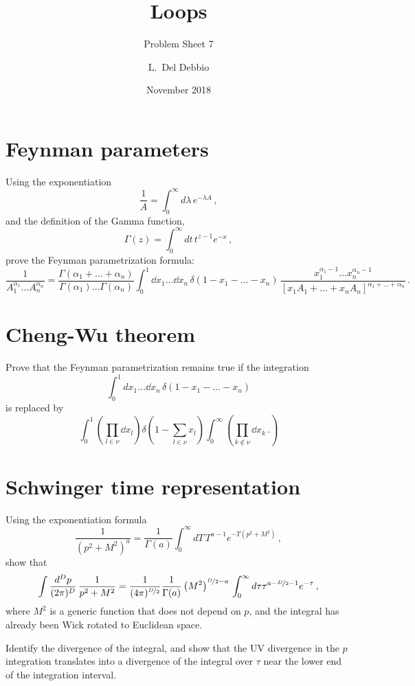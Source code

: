 \documentclass{tutorial}
\subtitle{Problem Sheet 7}
\title{Loops}
\author{L.~Del Debbio}
\date{November 2018}
\begin{document}
\maketitle

\section{ Feynman parameters}

  Using the exponentiation
  \[
    \frac{1}{A} = \int_0^\infty d\lambda\, e^{-\lambda A}\, ,
  \]
  and the definition of the Gamma function,
  \[
    \Gamma(z) = \int_0^\infty dt\, t^{z-1} e^{-x}\, ,
  \]
  prove the Feynman parametrization formula:
  \[
    \frac{1}{A_1^{\alpha_1} \ldots A_n^{\alpha_n}} =
    \frac{\Gamma(\alpha_1+\ldots+\alpha_n)}{\Gamma(\alpha_1) \ldots
      \Gamma(\alpha_n)} \int_0^1\dd{x_1} \ldots \dd{x_n}\,
    \delta(1-x_1-\ldots -x_n)\,
    \frac{x_1^{\alpha_1-1} \ldots x_n^{\alpha_n-1}}{\left[x_1 A_1 +
        \ldots + x_n A_n\right]^{\alpha_1+\ldots +\alpha_n}}\, .
  \]

  
  
\section{ Cheng-Wu theorem}

  Prove that the Feynman parametrization remains true if the
  integration
  \[
    \int_0^1dx_1 \ldots \dd{x_n}\,
    \delta(1-x_1-\ldots -x_n)
  \]
  is replaced by
  \[
    \int_0^1 \left(\prod_{l\in\nu} \dd{x_l}\right)
    \delta\left(1-\sum_{l\in\nu}x_l\right)
    \int_0^\infty \left(
      \prod_{k\not\in\nu}\dd{x_k}\, .
    \right)
  \]

  

\section{ Schwinger time representation}

  Using the exponentiation formula
  \[
    \frac{1}{(p^2+M^2)^a} = \frac{1}{\Gamma(a)} \int_0^\infty dT\,
    T^{a-1} e^{-T (p^2+M^2)}\, ,
  \]
  show that
  \[
    \int \frac{d^Dp}{(2\pi)^D}\, \frac{1}{p^2+M^2} =
    \frac{1}{(4\pi)^{\nicefrac{D}{2}}}  \frac{1}{\Gamma(a)} \left(M^2\right)^{\nicefrac{D}{2}-a}\, \int_0^\infty
    d\tau \tau^{a-\nicefrac{D}{2}-1} e^{-\tau}\, ,
  \]
  where $M^2$ is a generic function that does not depend on $p$, and
  the integral has already been Wick rotated to Euclidean space.

  Identify the divergence of the integral, and show that the UV
  divergence in the $p$ integration translates into a divergence of
  the integral over $\tau$ near the lower end of the integration
  interval.
\end{document}
